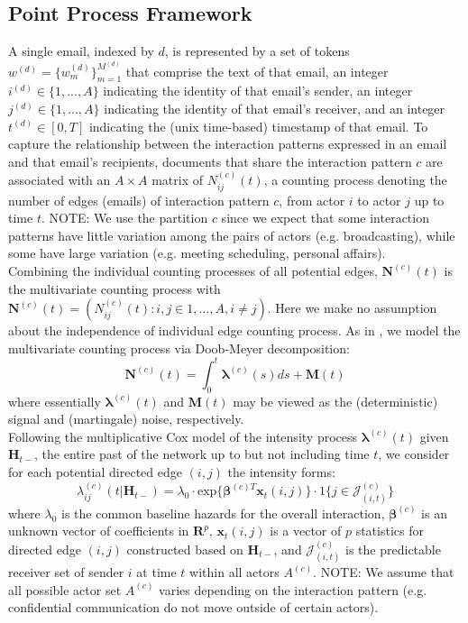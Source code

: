 \documentclass[a4paper]{article}
\begin{document}
\subsection{Point Process Framework}
A single email, indexed by $d$, is represented by a set of tokens $w^{(d)} = \{w^{(d)}_m \}_{m=1}^{M^{(d)}}$ that comprise the
text of that email, an integer $i^{(d)} \in \{1,...,A\}$ indicating the identity of that email’s sender, an integer $j^{(d)} \in \{1,...,A\}$ indicating the identity of that email’s receiver, and an integer $t^{(d)} \in [0, T]$ indicating the (unix time-based) timestamp of that email. To capture the relationship between the interaction patterns expressed in an email and that email’s recipients, documents that share the interaction pattern $c$ are associated with an $A\times A$ matrix of $N^{(c)}_{ij}(t)$, a counting process denoting the number of edges (emails) of interaction pattern $c$, from actor $i$ to actor $j$ up to time $t$. NOTE: We use the partition $c$ since we expect that some interaction patterns have little variation among the pairs of actors (e.g. broadcasting), while some have large variation (e.g. meeting scheduling, personal affairs). \\ \newline Combining the individual counting processes of all potential edges,  $\mathbf{N}^{(c)}(t)$ is the multivariate counting process with $\mathbf{N}^{(c)}(t)=(N^{(c)}_{ij}(t): i, j \in {1, ..., A}, i \neq j)$. Here we make no assumption about the independence of individual edge counting process. As in \cite{Vu2011}, we model the multivariate counting process via Doob-Meyer decomposition:
\begin{equation}
\mathbf{N}^{(c)}(t)=\int_0^t\boldsymbol{\lambda}^{(c)}(s)ds + \mathbf{M}(t)
\end{equation}
where essentially $\boldsymbol{\lambda}^{(c)}(t)$ and $\mathbf{M}(t)$ may be viewed as the (deterministic) signal and (martingale) noise, respectively.\\ \newline
Following the multiplicative Cox model of the intensity process $\boldsymbol{\lambda}^{(c)}(t)$ given $\boldsymbol{H}_{t-}$, the entire past of the network up to but not including time $t$, we consider for each potential directed edge $(i, j)$ the intensity forms:
\begin{equation}
\lambda^{(c)}_{ij}(t|\boldsymbol{H}_{t-})=\lambda_0\cdot \mbox{exp}\Big\{\boldsymbol{\beta}^{(c)T}\boldsymbol{x}_t(i, j)\Big\}\cdot 1\{j \in \mathcal{J}^{(c)}_{(i, t)}\}
\end{equation}
where $\lambda_0$ is the common baseline hazards for the overall interaction, $\boldsymbol{\beta}^{(c)}$ is an unknown vector of coefficients in $\boldsymbol{R}^{p}$, $\boldsymbol{x}_t(i, j)$ is a vector of $p$ statistics for directed edge $(i, j)$ constructed based on
$\boldsymbol{H}_{t-}$, and $\mathcal{J}^{(c)}_{(i, t)}$ is the predictable receiver set of sender $i$ at time $t$ within all actors $A^{(c)}$. NOTE: We assume that all possible actor set $A^{(c)}$ varies depending on the interaction pattern (e.g. confidential communication do not move outside of certain actors).
\end{document}
